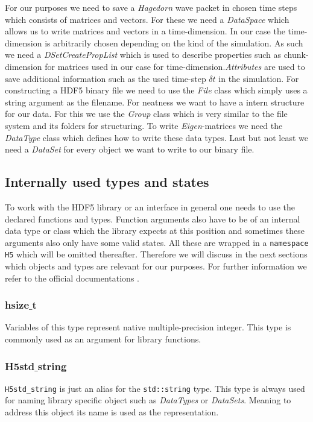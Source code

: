 \documentclass{article}
\begin{document}
For our purposes we need to save a \textit{Hagedorn} wave packet in chosen time steps which consists of matrices and vectors. 
For these we need a \textit{DataSpace} which allows us to write matrices and vectors in a time-dimension. In our case the time-dimension is arbitrarily chosen depending on the kind of the simulation. As such we need a \textit{DSetCreatePropList} which is used to describe properties such as chunk-dimension for matrices used in our case for time-dimension.\textit{Attributes} are used to save additional information such as the used time-step $\delta t$ in the simulation. For constructing a HDF5 binary file we need to use the \textit{File} class which simply uses a string argument as the filename. For neatness we want to have a intern structure for our data. For this we use the \textit{Group} class which is very similar to the file system and its folders for structuring. To write \textit{Eigen}-matrices we need the \textit{DataType} class which defines how to write these data types. Last but not least we need a \textit{DataSet} for every object we want to write to our binary file.

\subsection{Internally used types and states}
To work with the HDF5 library or an interface in general one needs to use the declared functions and types. Function arguments also have to be of an internal data type or class which the library expects at this position and sometimes these arguments also only have some valid states. All these are wrapped in a \texttt{namespace H5} which will be omitted thereafter. Therefore we will discuss in the next sections which objects and types are relevant for our purposes. For further information we refer to the official documentations \cite{hdf5cppdoc} \cite{hdf5cdoc}.
\subsubsection{hsize$\_$t}
Variables of this type represent native multiple-precision integer. This type is commonly used as an argument for library functions.
\subsubsection{H5std$\_$string}
\texttt{H5std\_string} is just an alias for the \texttt{std::string} type. This type is always used for naming library specific object such as \textit{DataTypes} or \textit{DataSets}. Meaning to address this object its name is used as the representation.
\end{document}
